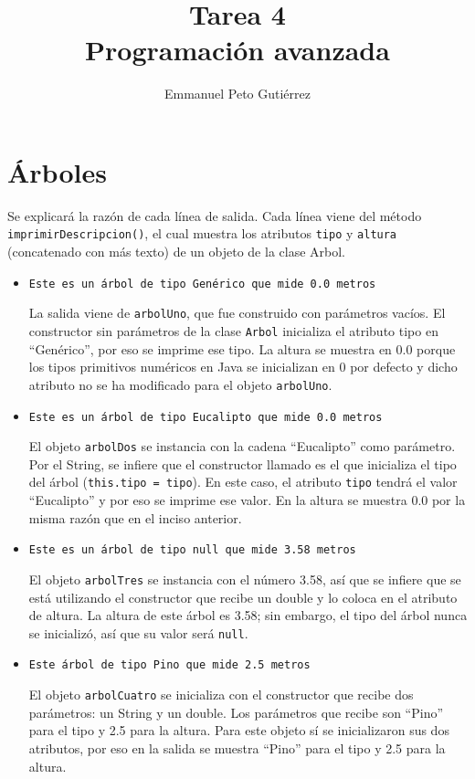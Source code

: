 \documentclass{article}
\title{Tarea 4\\Programación avanzada}
\author{Emmanuel Peto Gutiérrez}
\begin{document}
\maketitle

\section*{Árboles}

Se explicará la razón de cada línea de salida. Cada línea viene del método \texttt{imprimirDescripcion()}, el cual muestra los atributos \texttt{tipo} y \texttt{altura} (concatenado con más texto) de un objeto de la clase Arbol.

\begin{itemize}
\item \texttt{Este es un árbol de tipo Genérico que mide 0.0 metros}

La salida viene de \texttt{arbolUno}, que fue construido con parámetros vacíos. El constructor sin parámetros de la clase \texttt{Arbol} inicializa el atributo tipo en ``Genérico'', por eso se imprime ese tipo. La altura se muestra en 0.0 porque los tipos primitivos numéricos en Java se inicializan en 0 por defecto y dicho atributo no se ha modificado para el objeto \texttt{arbolUno}.

\item \texttt{Este es un árbol de tipo Eucalipto que mide 0.0 metros}

El objeto \texttt{arbolDos} se instancia con la cadena ``Eucalipto'' como parámetro. Por el String, se infiere que el constructor llamado es el que inicializa el tipo del árbol (\texttt{this.tipo = tipo}). En este caso, el atributo \texttt{tipo} tendrá el valor ``Eucalipto'' y por eso se imprime ese valor. En la altura se muestra 0.0 por la misma razón que en el inciso anterior.

\item \texttt{Este es un árbol de tipo null que mide 3.58 metros}

El objeto \texttt{arbolTres} se instancia con el número 3.58, así que se infiere que se está utilizando el constructor que recibe un double y lo coloca en el atributo de altura. La altura de este árbol es 3.58; sin embargo, el tipo del árbol nunca se inicializó, así que su valor será \texttt{null}.

\item \texttt{Este árbol de tipo Pino que mide 2.5 metros}

El objeto \texttt{arbolCuatro} se inicializa con el constructor que recibe dos parámetros: un String y un double. Los parámetros que recibe son ``Pino'' para el tipo y 2.5 para la altura. Para este objeto sí se inicializaron sus dos atributos, por eso en la salida se muestra ``Pino'' para el tipo y 2.5 para la altura.

\end{itemize}
\end{document}
